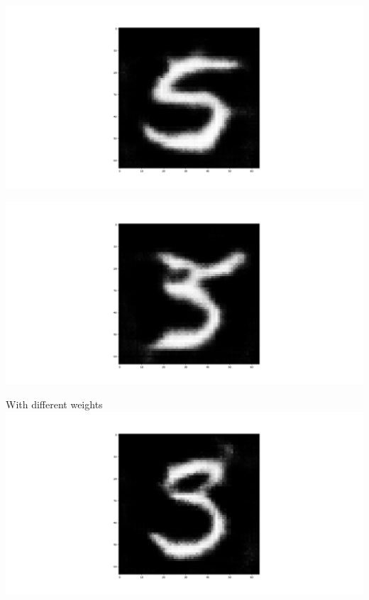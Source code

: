 \documentclass{beamer}
\begin{document}
\begin{frame}
    \centering
    \includegraphics[scale=0.2]{images/gen5.png}
\end{frame}

\begin{frame}
    \centering
    \includegraphics[scale=0.2]{images/gen35.png}
\end{frame}

\begin{frame}{With different weights}
    \centering
    \includegraphics[scale=0.2]{images/gen35with3weighted.png}
\end{frame}
\end{document}
